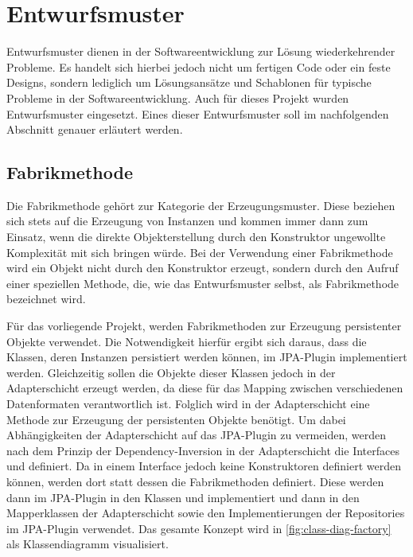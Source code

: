 \chapter{Entwurfsmuster}
Entwurfsmuster dienen in der Softwareentwicklung zur Lösung wiederkehrender Probleme. Es handelt sich hierbei jedoch nicht um fertigen Code oder ein feste Designs, sondern lediglich um Lösungsansätze und Schablonen für typische Probleme in der Softwareentwicklung. Auch für dieses Projekt wurden Entwurfsmuster eingesetzt. Eines dieser Entwurfsmuster soll im nachfolgenden Abschnitt genauer erläutert werden.

\section{Fabrikmethode}
Die Fabrikmethode gehört zur Kategorie der Erzeugungsmuster. Diese beziehen sich stets auf die Erzeugung von Instanzen und kommen immer dann zum Einsatz, wenn die direkte Objekterstellung durch den Konstruktor ungewollte Komplexität mit sich bringen würde. 
Bei der Verwendung einer Fabrikmethode wird ein Objekt nicht durch den Konstruktor erzeugt, sondern durch den Aufruf einer speziellen Methode, die, wie das Entwurfsmuster selbst, als Fabrikmethode bezeichnet wird.

Für das vorliegende Projekt, werden Fabrikmethoden zur Erzeugung persistenter Objekte verwendet. Die Notwendigkeit hierfür ergibt sich daraus, dass die Klassen, deren Instanzen persistiert werden können, im \acs{JPA}-Plugin implementiert werden. Gleichzeitig sollen die Objekte dieser Klassen jedoch in der Adapterschicht erzeugt werden, da diese für das Mapping zwischen verschiedenen Datenformaten verantwortlich ist. Folglich wird in der Adapterschicht eine Methode zur Erzeugung der persistenten Objekte benötigt. Um dabei Abhängigkeiten der Adapterschicht auf das \acs{JPA}-Plugin zu vermeiden, werden nach dem Prinzip der Dependency-Inversion in der Adapterschicht die Interfaces  und  definiert. Da in einem Interface jedoch keine Konstruktoren definiert werden können, werden dort statt dessen die Fabrikmethoden definiert. Diese werden dann im \acs{JPA}-Plugin in den Klassen  und  implementiert und dann in den Mapperklassen der Adapterschicht sowie den Implementierungen der Repositories im \acs{JPA}-Plugin verwendet. Das gesamte Konzept wird in \autoref{fig:class-diag-factory} als Klassendiagramm visualisiert.

